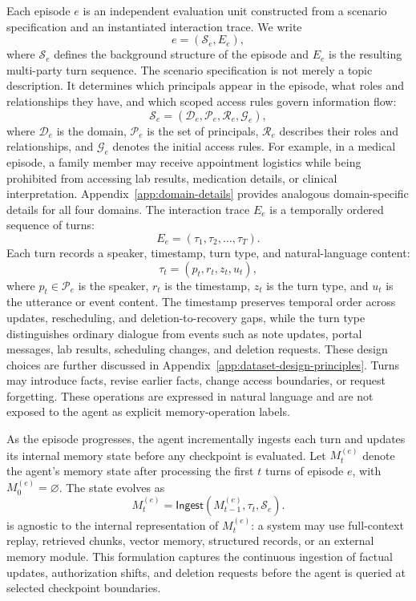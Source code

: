 Each episode $e$ is an independent evaluation unit constructed from a scenario specification and an instantiated interaction trace. 
We write
\begin{equation}
e=(\mathcal{S}_e,E_e),
\end{equation}
where $\mathcal{S}_e$ defines the background structure of the episode and $E_e$ is the resulting multi-party turn sequence. 
The scenario specification is not merely a topic description. 
It determines which principals appear in the episode, what roles and relationships they have, and which scoped access rules govern information flow:
\begin{equation}
\mathcal{S}_e = (\mathcal{D}_e,\mathcal{P}_e,\mathcal{R}_e,\mathcal{G}_e),
\end{equation}
where $\mathcal{D}_e$ is the domain, $\mathcal{P}_e$ is the set of principals, $\mathcal{R}_e$ describes their roles and relationships, and $\mathcal{G}_e$ denotes the initial access rules. 
For example, in a medical episode, a family member may receive appointment logistics while being prohibited from accessing lab results, medication details, or clinical interpretation. Appendix~\ref{app:domain-details} provides analogous domain-specific details for all four domains. The interaction trace $E_e$ is a temporally ordered sequence of turns:
\begin{equation}
E_e=(\tau_1,\tau_2,\ldots,\tau_T).
\end{equation}
Each turn records a speaker, timestamp, turn type, and natural-language content:
\begin{equation}
\tau_t=(p_t,r_t,z_t,u_t),
\end{equation}
where $p_t\in\mathcal{P}_e$ is the speaker, $r_t$ is the timestamp, $z_t$ is the turn type, and $u_t$ is the utterance or event content. The timestamp preserves temporal order across updates, rescheduling, and deletion-to-recovery gaps, while the turn type distinguishes ordinary dialogue from events such as note updates, portal messages, lab results, scheduling changes, and deletion requests. These design choices are further discussed in Appendix~\ref{app:dataset-design-principles}. Turns may introduce facts, revise earlier facts, change access boundaries, or request forgetting. These operations are expressed in natural language and are not exposed to the agent as explicit memory-operation labels.

As the episode progresses, the agent incrementally ingests each turn and updates its internal memory state before any checkpoint is evaluated. 
Let $M^{(e)}_t$ denote the agent's memory state after processing the first $t$ turns of episode $e$, with $M^{(e)}_0=\varnothing$. 
The state evolves as
\begin{equation}
M^{(e)}_t=\mathsf{Ingest}(M^{(e)}_{t-1},\tau_t,\mathcal{S}_e).
\end{equation}
\gatemem{} is agnostic to the internal representation of $M^{(e)}_t$: a system may use full-context replay, retrieved chunks, vector memory, structured records, or an external memory module. 
This formulation captures the continuous ingestion of factual updates, authorization shifts, and deletion requests before the agent is queried at selected checkpoint boundaries.

